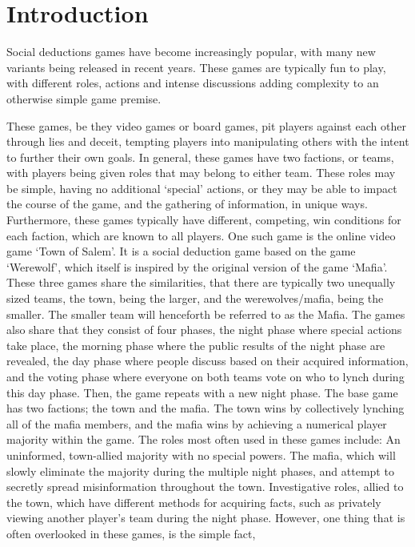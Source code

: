 \section{Introduction}
Social deductions games have become increasingly popular, with many new 
variants being released in recent years. These games are typically fun to play, 
with different roles, actions and intense discussions adding complexity to an 
otherwise simple game premise. 

These games, be they video games or board games, pit players against each other 
through lies and deceit, tempting players into manipulating others with the 
intent to further their own goals. In general, these games have two factions, 
or teams, with players being given roles that may belong to either team. These 
roles may be simple, having no additional ‘special’ actions, or they may be 
able to impact the course of the game, and the gathering of information, in 
unique ways. Furthermore, these games typically have different, competing, win 
conditions for each faction, which are known to all players. One such game is 
the online video game ‘Town of Salem’. It is a social deduction game based on 
the game ‘Werewolf’, which itself is inspired by the original version of the 
game ‘Mafia’. These three games share the similarities, that there are 
typically two unequally sized teams, the town, being the larger, and the 
werewolves/mafia, being the smaller. The smaller team will henceforth be 
referred to as the Mafia. The games also share that they consist of four 
phases, the night phase where special actions take place, the morning phase 
where the public results of the night phase are revealed, the day phase where 
people discuss based on their acquired information, and the voting phase where 
everyone on both teams vote on who to lynch during this day phase. Then, the 
game repeats with a new night phase. 
The base game has two factions; the town and the mafia. The town wins by 
collectively lynching all of the mafia members, and the mafia wins by achieving 
a numerical player majority within the game. The roles most often used in these 
games include: An uninformed, town-allied majority with no special powers. The 
mafia, which will slowly eliminate the majority during the multiple night 
phases, and attempt to secretly spread misinformation throughout the town. 
Investigative roles, allied to the town, which have different methods for 
acquiring facts, such as privately viewing another player’s team during the 
night phase. 
However, one thing that is often overlooked in these games, is the simple fact, 
